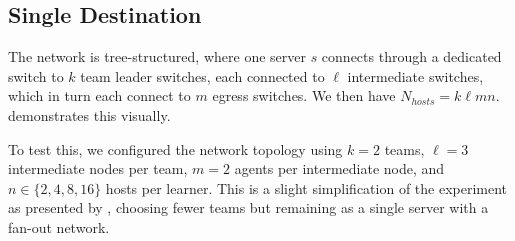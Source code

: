 \documentclass[10pt, times, comsoc]{IEEEtran}
\newcommand{\wvec}[1]{\ensuremath{\bm{w}_{#1}}}
\begin{document}
\subsection{Single Destination}\label{sec:single-dest}
The network is tree-structured, where one server $s$ connects through a dedicated switch to $k$ team leader switches, each connected to $\ell$ intermediate switches, which in turn each connect to $m$ egress switches.
We then have $N_{\mathit{hosts}} = k \ell m n$.
 demonstrates this visually.


To test this, we configured the network topology using $k=2$ teams, $\ell=3$ intermediate nodes per team, $m=2$ agents per intermediate node, and $n \in \{2, 4, 8, 16\}$ hosts per learner.
This is a slight simplification of the  experiment as presented by \textcite{DBLP:journals/eaai/MalialisK15}, choosing fewer teams but remaining as a single server with a fan-out network.
\end{document}
